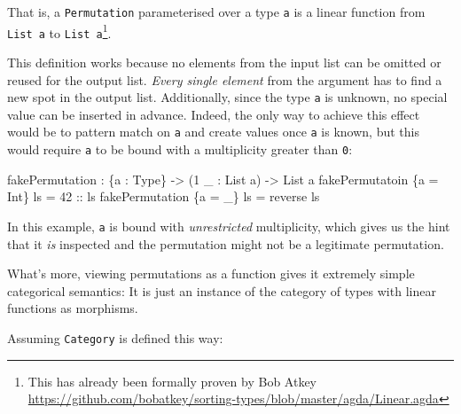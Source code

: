 \documentclass[
]{article}
\newenvironment{Shaded}{}{}
\newcommand{\DataTypeTok}[1]{\textcolor[rgb]{0.56,0.13,0.00}{#1}}
\newcommand{\DecValTok}[1]{\textcolor[rgb]{0.25,0.63,0.44}{#1}}
\newcommand{\FunctionTok}[1]{\textcolor[rgb]{0.02,0.16,0.49}{#1}}
\newcommand{\NormalTok}[1]{#1}
\newcommand{\OperatorTok}[1]{\textcolor[rgb]{0.40,0.40,0.40}{#1}}
\newcommand{\OtherTok}[1]{\textcolor[rgb]{0.00,0.44,0.13}{#1}}
\begin{document}
That is, a \texttt{Permutation} parameterised over a type \texttt{a} is
a linear function from \texttt{List\ a} to \texttt{List\ a}\footnote{This
  has already been formally proven by Bob Atkey
  \url{https://github.com/bobatkey/sorting-types/blob/master/agda/Linear.agda}}.

This definition works because no elements from the input list can be
omitted or reused for the output list. \emph{Every single element} from
the argument has to find a new spot in the output list. Additionally,
since the type \texttt{a} is unknown, no special value can be inserted
in advance. Indeed, the only way to achieve this effect would be to
pattern match on \texttt{a} and create values once \texttt{a} is known,
but this would require \texttt{a} to be bound with a multiplicity
greater than \texttt{0}:

\begin{Shaded}
\begin{Highlighting}[]
\NormalTok{fakePermutation }\OperatorTok{:}\NormalTok{ \{a }\OperatorTok{:} \DataTypeTok{Type}\NormalTok{\} }\OtherTok{{-}\textgreater{}}\NormalTok{ (}\DecValTok{1}\NormalTok{ \_ }\OperatorTok{:} \DataTypeTok{List}\NormalTok{ a) }\OtherTok{{-}\textgreater{}} \DataTypeTok{List}\NormalTok{ a}
\NormalTok{fakePermutatoin \{a }\OtherTok{=} \DataTypeTok{Int}\NormalTok{\} ls }\OtherTok{=} \DecValTok{42}\OtherTok{ ::}\NormalTok{ ls}
\NormalTok{fakePermutation \{a }\OtherTok{=}\NormalTok{ \_\} ls }\OtherTok{=} \FunctionTok{reverse}\NormalTok{ ls}
\end{Highlighting}
\end{Shaded}

In this example, \texttt{a} is bound with \emph{unrestricted}
multiplicity, which gives us the hint that it \emph{is} inspected and
the permutation might not be a legitimate permutation.

What's more, viewing permutations as a function gives it extremely
simple categorical semantics: It is just an instance of the category of
types with linear functions as morphisms.

Assuming \texttt{Category} is defined this way:
\end{document}
